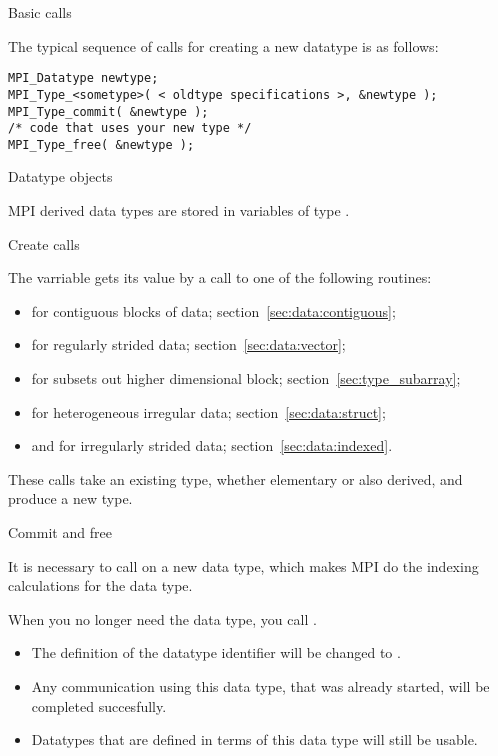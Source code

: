  {Basic calls}
\label{sec:data-commit}

The typical sequence of calls for creating a new datatype is as follows:
\begin{lstlisting}
MPI_Datatype newtype;
MPI_Type_<sometype>( < oldtype specifications >, &newtype );
MPI_Type_commit( &newtype );
/* code that uses your new type */
MPI_Type_free( &newtype );
\end{lstlisting}

 {Datatype objects}
\label{sec:mpi-datatype}

MPI derived data types are stored in variables of type
.

 {Create calls}

The  varriable gets its value by a call to
one of the following routines:
\begin{itemize}
\item {} for contiguous blocks of
  data; section~\ref{sec:data:contiguous};
\item {} for regularly strided data;
  section~\ref{sec:data:vector};
\item {} for subsets out higher
  dimensional block; section~\ref{sec:type_subarray};
\item {} for heterogeneous irregular data;
  section~\ref{sec:data:struct};
\item {} and
   for irregularly strided data;
  section~\ref{sec:data:indexed}.
\end{itemize}
These calls take an existing type, whether elementary or also derived,
and produce a new type.

 {Commit and free}

It is necessary to call  on a new data
type, which makes MPI do the indexing calculations for the data type.

When you no longer
need the data type, you call .

\begin{itemize}
\item The definition of the datatype identifier will be changed to
  .
\item Any communication using this data type, that was already
  started, will be completed succesfully.
\item Datatypes that are defined in terms of this data type will still
  be usable.
\end{itemize}

